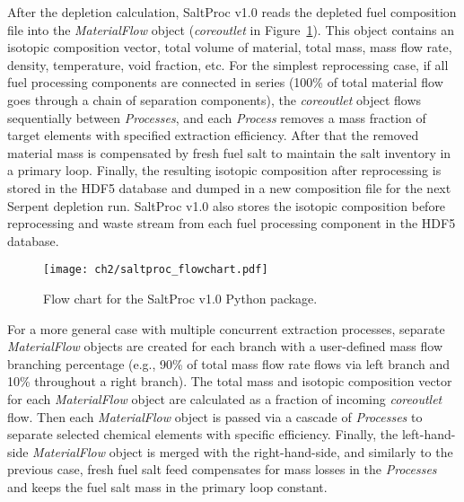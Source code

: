 After the depletion calculation, SaltProc v1.0 reads the depleted fuel 
composition file into the \textit{MaterialFlow} object 
(\textit{core\textunderscore outlet} in Figure~\ref{fig:saltproc_flow}). This 
object contains an isotopic composition vector, total volume of material, 
total mass, mass flow rate, density, temperature, void fraction, etc. For the 
simplest reprocessing case, if all fuel processing components are connected in 
series (100\% of total material flow goes through a chain of separation 
components), the \textit{core\textunderscore outlet} object flows sequentially 
between \textit{Processes}, and each \textit{Process} removes a mass fraction 
of target elements with specified extraction efficiency. 
After that the removed material mass is compensated by fresh fuel salt to 
maintain the salt inventory in a primary loop. Finally, the resulting isotopic 
composition after reprocessing is stored in the HDF5 database and dumped in a 
new composition file for the next Serpent depletion run. SaltProc v1.0 also 
stores the isotopic composition before reprocessing and waste stream from each 
fuel processing component in the HDF5 database. 
\begin{figure}[ht!] %
	\centering
	\texttt{[image: ch2/saltproc\_flowchart.pdf]}
	\vspace{-0.15in}
	\caption{Flow chart for the SaltProc v1.0 Python package.}
	\label{fig:saltproc_flow}
\end{figure}

For a more general case with multiple concurrent extraction processes,  
separate \textit{MaterialFlow} objects are created for each branch with a 
user-defined mass flow branching percentage (e.g., 90\% of total mass flow 
rate flows via left branch and 10\% throughout a right branch). The total mass 
and isotopic composition vector for each \textit{MaterialFlow} object are 
calculated as a fraction of incoming \textit{core\textunderscore outlet} flow. 
Then each \textit{MaterialFlow} object is passed via a cascade of 
\textit{Processes} to separate selected chemical elements with specific 
efficiency. Finally, the left-hand-side \textit{MaterialFlow} object is merged 
with the right-hand-side, and similarly to the previous case, fresh fuel salt 
feed compensates for mass losses in the \textit{Processes} and keeps the fuel 
salt mass in the primary loop constant.

